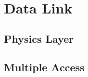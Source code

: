 \section{Data Link}
\lipsum[1]
\subsection{Physics Layer}
\lipsum[3-4]
\subsection{Multiple Access}
\lipsum[5-6]